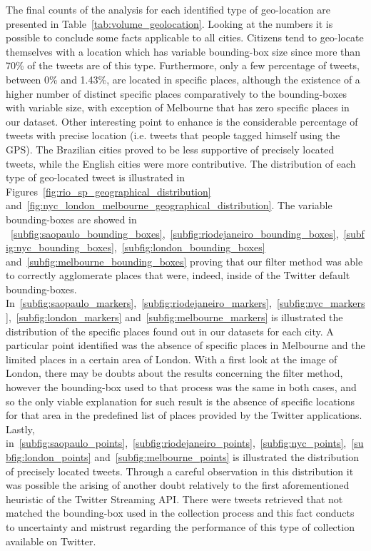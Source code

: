 The final counts of the analysis for each identified type of geo-location are presented in Table~\ref{tab:volume_geolocation}. Looking at the numbers it is possible to conclude some facts applicable to all cities. Citizens tend to geo-locate themselves with a location which has variable bounding-box size since more than 70\% of the tweets are of this type. Furthermore, only a few percentage of tweets, between 0\% and 1.43\%, are located in specific places, although the existence of a higher number of distinct specific places comparatively to the bounding-boxes with variable size, with exception of Melbourne that has zero specific places in our dataset. Other interesting point to enhance is the considerable percentage of tweets with precise location (i.e. tweets that people tagged himself using the GPS). The Brazilian cities proved to be less supportive of precisely located tweets, while the English cities were more contributive. The distribution of each type of geo-located tweet is illustrated in Figures~\ref{fig:rio_sp_geographical_distribution} and~\ref{fig:nyc_london_melbourne_geographical_distribution}. The variable bounding-boxes are showed in ~\ref{subfig:saopaulo_bounding_boxes},~\ref{subfig:riodejaneiro_bounding_boxes},~\ref{subfig:nyc_bounding_boxes},~\ref{subfig:london_bounding_boxes} and~\ref{subfig:melbourne_bounding_boxes} proving that our filter method was able to correctly agglomerate places that were, indeed, inside of the Twitter default bounding-boxes. In~\ref{subfig:saopaulo_markers},~\ref{subfig:riodejaneiro_markers},~\ref{subfig:nyc_markers},~\ref{subfig:london_markers} and~\ref{subfig:melbourne_markers} is illustrated the distribution of the specific places found out in our datasets for each city. A particular point identified was the absence of specific places in Melbourne and the limited places in a certain area of London. With a first look at the image of London, there may be doubts about the results concerning the filter method, however the bounding-box used to that process was the same in both cases, and so the only viable explanation for such result is the absence of specific locations for that area in the predefined list of places provided by the Twitter applications. Lastly, in~\ref{subfig:saopaulo_points},~\ref{subfig:riodejaneiro_points},~\ref{subfig:nyc_points},~\ref{subfig:london_points} and~\ref{subfig:melbourne_points} is illustrated the distribution of precisely located tweets. Through a careful observation in this distribution it was possible the arising of another doubt relatively to the first aforementioned heuristic of the Twitter Streaming API. There were tweets retrieved that not matched the bounding-box used in the collection process and this fact conducts to uncertainty and mistrust regarding the performance of this type of collection available on Twitter. 

